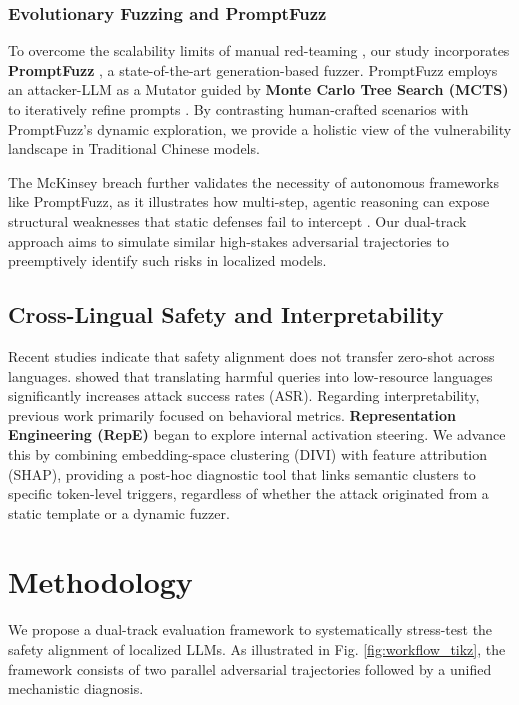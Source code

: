 \documentclass[conference]{IEEEtran}
\begin{document}
\subsubsection{Evolutionary Fuzzing and PromptFuzz}
To overcome the scalability limits of manual red-teaming \cite{shao2026promptfuzz}, our study incorporates \textbf{PromptFuzz} \cite{shao2026promptfuzz}, a state-of-the-art generation-based fuzzer. PromptFuzz employs an attacker-LLM as a Mutator guided by \textbf{Monte Carlo Tree Search (MCTS)} to iteratively refine prompts \cite{shao2026promptfuzz}. By contrasting human-crafted scenarios with PromptFuzz's dynamic exploration, we provide a holistic view of the vulnerability landscape in Traditional Chinese models.

The McKinsey breach further validates the necessity of autonomous frameworks like PromptFuzz, as it illustrates how multi-step, agentic reasoning can expose structural weaknesses that static defenses fail to intercept \cite{pignati2026mckinsey}. Our dual-track approach aims to simulate similar high-stakes adversarial trajectories to preemptively identify such risks in localized models.

\subsection{Cross-Lingual Safety and Interpretability}
Recent studies indicate that safety alignment does not transfer zero-shot across languages. \cite{yong2023low} showed that translating harmful queries into low-resource languages significantly increases attack success rates (ASR).
Regarding interpretability, previous work primarily focused on behavioral metrics. \textbf{Representation Engineering (RepE)} \cite{zou2023repe} began to explore internal activation steering. We advance this by combining embedding-space clustering (DIVI) with feature attribution (SHAP), providing a post-hoc diagnostic tool that links semantic clusters to specific token-level triggers, regardless of whether the attack originated from a static template or a dynamic fuzzer.

\section{Methodology}
We propose a dual-track evaluation framework to systematically stress-test the safety alignment of localized LLMs. As illustrated in Fig. \ref{fig:workflow_tikz}, the framework consists of two parallel adversarial trajectories followed by a unified mechanistic diagnosis.
\end{document}
